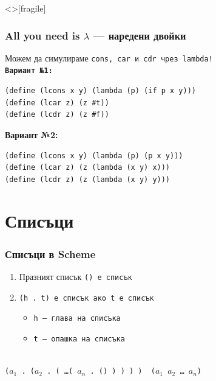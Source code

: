 \documentclass[alsotrans,beameroptions={aspectratio=169}]{beamerswitch}
\begin{document}
\begin{frame}<>[fragile]
  \frametitle{All you need is $\lambda$ --- наредени двойки}

  Можем да симулираме \tt{cons}, \tt{car} и \tt{cdr} чрез \tt{lambda}!\\[2ex]
  \pause
  \textbf{Вариант №1:}
\begin{lstlisting}
(define (lcons x y) (lambda (p) (if p x y)))
(define (lcar z) (z #t))
(define (lcdr z) (z #f))
\end{lstlisting}
  \pause
  \textbf{Вариант №2:}
\begin{lstlisting}
(define (lcons x y) (lambda (p) (p x y)))
(define (lcar z) (z (lambda (x y) x)))
(define (lcdr z) (z (lambda (x y) y)))
\end{lstlisting}
\end{frame}

\section{Списъци}

\begin{frame}
  \frametitle{Списъци в Scheme}

  \begin{definition}
    \begin{enumerate}
    \item Празният списък \tt{()} е списък
    \item \tt{(h . t)} е списък ако \tt t е списък
      \begin{itemize}
      \item \tt h --- глава на списъка
      \item \tt t --- опашка на списъка
      \end{itemize}
    \end{enumerate}
  \end{definition}
  \vspace{4ex}
  \pause
  \\[3ex]
  \tt{($a_1$ . ($a_2$ . ( \ldots ( $a_n$ . () ) ) ) ) \eqv\ ($a_1$ $a_2$ \ldots\ $a_n$)}
\end{frame}
\end{document}
